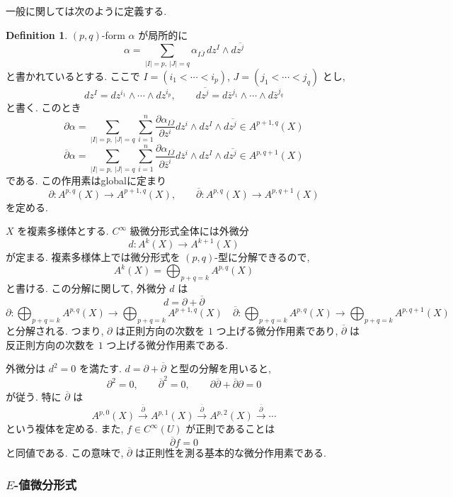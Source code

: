 \documentclass[dvipdfmx,a4paper,11pt]{article} %
\theoremstyle{definition}
\newtheorem{defn}[thm]{Definition}
\theoremstyle{remark}
\numberwithin{equation}{section}
\begin{document}
一般に関しては次のように定義する. 
\begin{defn}
 \((p,q)\)-form \(\alpha\) が局所的に
\[
\alpha=\sum_{|I|=p,\ |J|=q}\alpha_{I\overline{J}}\,dz^I\wedge d\overline{z^j}
\]
と書かれているとする. ここで \(I=(i_1<\cdots<i_p)\), \(J=(j_1<\cdots<j_q)\) とし,
\[
dz^I=dz^{i_1}\wedge\cdots\wedge dz^{i_p},\qquad
d\overline{z^j}=d\overline{z}^{j_1}\wedge\cdots\wedge d\overline{z}^{j_q}
\]
と書く. このとき
\[
\partial\alpha=
\sum_{|I|=p,\ |J|=q}\sum_{i=1}^n
\frac{\partial \alpha_{I\overline{J}}}{\partial z^i}
dz^i\wedge dz^I\wedge d\overline{z^j}
\in A^{p+1, q}(X)
\]
\[
\overline{\partial}\alpha=
\sum_{|I|=p,\ |J|=q}\sum_{i=1}^n
\frac{\partial \alpha_{I\overline{J}}}{\partial \overline{z}^i}
d\overline{z}^i\wedge dz^I\wedge d\overline{z^j}  \in A^{p, q+1}(X)
\]
である. 
この作用素はglobalに定まり
\[
\partial\colon A^{p,q}(X)\longrightarrow A^{p+1,q}(X),\qquad
\overline{\partial}\colon A^{p,q}(X)\longrightarrow A^{p,q+1}(X)
\]
を定める. 

\(X\) を複素多様体とする. \(C^\infty\) 級微分形式全体には外微分
\[
d\colon A^k(X)\longrightarrow A^{k+1}(X)
\]
が定まる. 複素多様体上では微分形式を \((p,q)\)-型に分解できるので,
\[
A^k(X)=\bigoplus_{p+q=k}A^{p,q}(X)
\]
と書ける. この分解に関して, 外微分 \(d\) は
\[
d=\partial+\overline{\partial}
\]
\[
 \partial : \bigoplus_{p+q=k}A^{p,q}(X) \to \bigoplus_{p+q=k}A^{p+1,q}(X) 
\quad \overline{\partial} : \bigoplus_{p+q=k}A^{p,q}(X) \to \bigoplus_{p+q=k}A^{p,q+1}(X) 
\]
と分解される.  つまり, \(\partial\) は正則方向の次数を \(1\) つ上げる微分作用素であり, \(\overline{\partial}\) は反正則方向の次数を \(1\) つ上げる微分作用素である.
\end{defn}

外微分は \(d^2=0\) を満たす. \(d=\partial+\overline{\partial}\) と型の分解を用いると,
\[
\partial^2=0,\qquad
\overline{\partial}^2=0,\qquad
\partial\overline{\partial}+\overline{\partial}\partial=0
\]
が従う. 特に \(\overline{\partial}\) は
\[
A^{p,0}(X)\xrightarrow{\overline{\partial}}A^{p,1}(X)
\xrightarrow{\overline{\partial}}A^{p,2}(X)
\xrightarrow{\overline{\partial}}\cdots
\]
という複体を定める. また, \(f\in C^\infty(U)\) が正則であることは
\[
\overline{\partial}f=0
\]
と同値である. この意味で, \(\overline{\partial}\) は正則性を測る基本的な微分作用素である.

\subsubsection{\(E\)-値微分形式}
\end{document}

